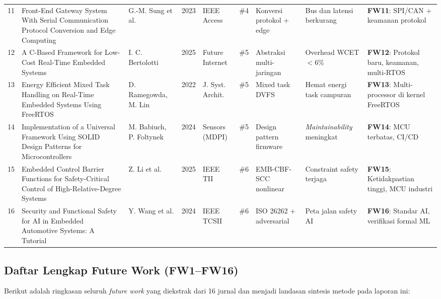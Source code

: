 \documentclass[12pt,a4paper]{article}
\begin{document}
\begin{landscape}
\begin{longtable}{@{}p{0.4cm}p{3.2cm}p{1.8cm}p{0.7cm}p{2.2cm}p{0.9cm}p{2.5cm}p{2.8cm}p{3.5cm}@{}}
11 & Front-End Gateway System With Serial Communication Protocol Conversion and Edge Computing & G.-M. Sung et al. & 2023 & IEEE Access & \#4 & Konversi protokol + edge & Bus dan latensi berkurang & \textbf{FW11}: SPI/CAN + keamanan protokol \\
12 & A C-Based Framework for Low-Cost Real-Time Embedded Systems & I. C. Bertolotti & 2025 & Future Internet & \#5 & Abstraksi multi-jaringan & Overhead WCET $<$6\% & \textbf{FW12}: Protokol baru, keamanan, multi-RTOS \\
13 & Energy Efficient Mixed Task Handling on Real-Time Embedded Systems Using FreeRTOS & D. Ramegowda, M. Lin & 2022 & J. Syst. Archit. & \#5 & Mixed task DVFS & Hemat energi task campuran & \textbf{FW13}: Multi-processor di kernel FreeRTOS \\
14 & Implementation of a Universal Framework Using SOLID Design Patterns for Microcontrollers & M. Babiuch, P. Foltynek & 2024 & Sensors (MDPI) & \#5 & Design pattern firmware & \textit{Maintainability} meningkat & \textbf{FW14}: MCU terbatas, CI/CD \\
15 & Embedded Control Barrier Functions for Safety-Critical Control of High-Relative-Degree Systems & Z. Li et al. & 2025 & IEEE TII & \#6 & EMB-CBF-SCC nonlinear & Constraint safety terjaga & \textbf{FW15}: Ketidakpastian tinggi, MCU industri \\
16 & Security and Functional Safety for AI in Embedded Automotive Systems: A Tutorial & Y. Wang et al. & 2024 & IEEE TCSII & \#6 & ISO 26262 + adversarial & Peta jalan safety AI & \textbf{FW16}: Standar AI, verifikasi formal ML \\


\end{longtable}
\end{landscape}

\subsection{Daftar Lengkap Future Work (FW1--FW16)}

Berikut adalah ringkasan seluruh \textit{future work} yang diekstrak dari 16 jurnal dan menjadi landasan sintesis metode pada laporan ini:
\end{document}
